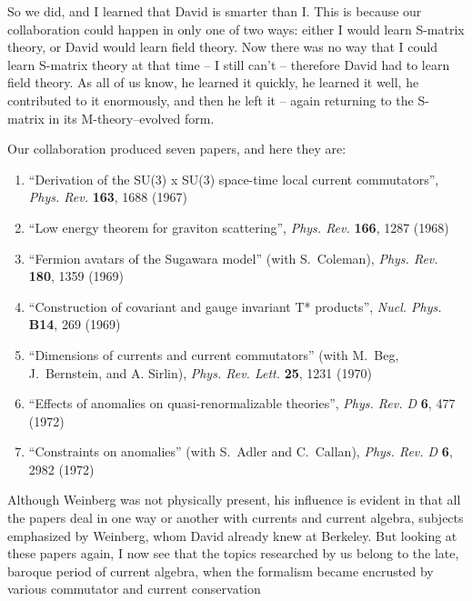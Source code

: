 \documentclass[a4paper,12pt,twoside]{article}
\def\Journal#1#2#3#4{{\em #1} {\bf #2}, #3 (#4)}
\def\NPB{Nucl. Phys.} %
\def\PRL{Phys. Rev. Lett.}
\def\PRD{Phys. Rev. D}
\def\PR{Phys. Rev.}
\begin{document}
So we did, and I learned that David is smarter than I.  This is because our
collaboration could happen in only one of two ways:  either I would learn S-matrix
theory, or David would learn field theory. Now there was no way that I could learn
S-matrix theory at that time -- I still can't --  therefore David had to learn field
theory.  As all of us know, he learned it quickly, he learned it well, he contributed to
it enormously, and then he left it -- again returning to the S-matrix   in its
M-theory--evolved form. 

Our collaboration
produced seven papers, and here they are: 

\begin{enumerate}

\item \label{pap1}
``Derivation of the SU(3) x SU(3) space-time local current
commutators'', \Journal{\PR}{163}{1688}{1967} 

\item \label{pap2}
``Low energy theorem for graviton scattering'', \Journal{\PR}{166}{1287}{1968} 

\item \label{pap3}
``Fermion avatars of the Sugawara model'' (with S.~Coleman),
\Journal{\PR}{180}{1359}{1969} 

\item \label{pap4}
``Construction of covariant and gauge invariant T* products'',
\Journal{\NPB}{B14}{269}{1969} 

\item \label{pap5}
``Dimensions of currents and current commutators'' (with M.~Beg, J.~Bernstein, and
A. Sirlin),
\Journal{\PRL}{25}{1231}{1970} 

\item \label{pap6}
``Effects of anomalies on quasi-renormalizable theories'',
\Journal{\PRD}{6}{477}{1972} 

\item \label{pap7}
``Constraints on anomalies''  (with S.~Adler and
C.~Callan), \Journal{\PRD}{6}{2982}{1972} 

\end{enumerate}
Although Weinberg was not
physically present, his influence is evident in that all the papers deal in one way or
another with currents and current algebra, subjects emphasized by Weinberg, whom
David already knew at Berkeley.  But looking at these papers again, I now see that the
topics researched by us belong to the late, baroque period of current algebra, when
the formalism became encrusted by various commutator and current conservation
\end{document}
